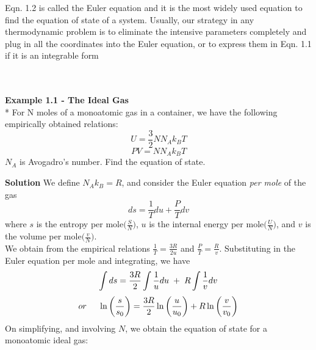 \documentclass[oneside]{book}
\begin{document}
Eqn. 1.2 is called the Euler equation and it is the most widely used equation to find the equation of state of a system. Usually, our strategy in any thermodynamic problem is to eliminate the intensive parameters completely and plug in all the coordinates into the Euler equation, or to express them in Eqn. 1.1 if it is an integrable form\\ \\ \\

\begin{mdframed}[style=exercise]
\textbf{Example 1.1 - The Ideal Gas}
\\*
For N moles of a monoatomic gas in a container, we have the following empirically obtained relations:
\[U = \frac{3}{2}NN_Ak_BT\]
\[PV = NN_Ak_BT\]
$N_A$ is Avogadro's number. Find the equation of state. 
\\ 
\end{mdframed}
\textbf{Solution} We define $N_Ak_B = R$, and consider the Euler equation \emph{per mole} of the gas
 \[ds =  \frac{1}{T}du  + \frac{P}{T}dv \]
 where $s$ is the entropy per mole$\big( \frac{S}{N} \big) $, $u$ is the internal energy per mole$\big( \frac{U}{N} \big) $, and $v$ is the volume per mole$\big( \frac{v}{N} \big) $.\\
 We obtain from the empirical relations $\frac{1}{T} = \frac{3R}{2u}$ and $\frac{P}{T} = \frac{R}{v}$. Substituting in the Euler equation per mole and integrating, we have
 \[ \int ds =  \frac{3R}{2}\int \frac{1}{u}du \hspace{0.1cm}+ \hspace{0.1cm} R\int \frac{1}{v}dv\]
 \[ or \hspace{0.5cm} \ln \bigg( \frac{s}{s_0} \bigg) =  \frac{3R}{2}\ln \bigg( \frac{u}{u_0} \bigg) + R\ln \bigg( \frac{v}{v_0} \bigg)\] 
 On simplifying, and involving $N$, we obtain the equation of state for a monoatomic ideal gas:\\
 \begin{center}
  \end{center}
 
\end{document}
